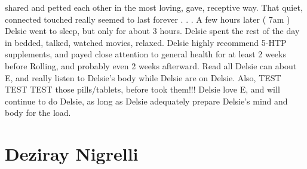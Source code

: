 \documentclass[12pt]{book}
\begin{document}
shared and petted each other in the most loving, gave, receptive way. That quiet, connected touched really seemed to last forever . . .  A few hours later ( 7am ) Delsie went to sleep, but only for about 3 hours. Delsie spent the rest of the day in bedded, talked, watched movies, relaxed. Delsie highly recommend 5-HTP supplements, and payed close attention to general health for at least 2 weeks before Rolling, and probably even 2 weeks afterward. Read all Delsie can about E, and really listen to Delsie's body while Delsie are on Delsie. Also, TEST TEST TEST those pills/tablets, before took them!!! Delsie love E, and will continue to do Delsie, as long as Delsie adequately prepare Delsie's mind and body for the load.



\chapter{Deziray Nigrelli}
\end{document}
